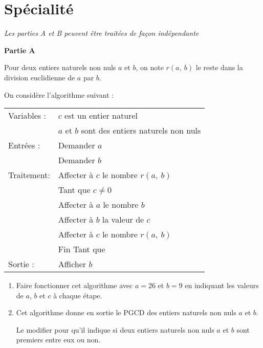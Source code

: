 \documentclass{cornouaille}
\begin{document}
\section{Spécialité}
\begin{exercice}[Spécialité][5]

\emph{Les parties A et B peuvent être traitées de façon indépendante}

\medskip

\textbf{Partie A}

\medskip

Pour deux entiers naturels non nuls $a$ et $b$, on note $r(a,~b)$ le reste dans la division euclidienne de $a$ par $b$.

On considère l'algorithme suivant :

\begin{center}
\begin{tabularx}{0.7\linewidth}{|l|X|}\hline
Variables :	& $c$ est un entier naturel\\
			&$a$ et $b$ sont des entiers naturels non nuls\\
Entrées :	&Demander $a$\\
			&Demander $b$\\
Traitement:	&Affecter à $c$ le nombre $r(a,~b)$\\
			&Tant que $c \ne 0$\\
			&\hspace{0.5cm}Affecter à $a$ le nombre $b$\\
			&\hspace{0.5cm}Affecter à $b$ la valeur de $c$\\
			&\hspace{0.5cm}Affecter à $c$ le nombre $r(a,~b)$\\
			&Fin Tant que\\
Sortie :	&Afficher $b$\\ \hline
			\end{tabularx}
			\end{center}

\begin{enumerate}
\item Faire fonctionner cet algorithme avec $a = 26$ et $b = 9$ en indiquant les valeurs de $a$, $b$ et $c$ à chaque étape.
\item Cet algorithme donne en sortie le PGCD des entiers naturels non nuls $a$ et $b$.

Le modifier pour qu'il indique si deux entiers naturels non nuls $a$ et $b$ sont premiers entre
eux ou non.
\end{enumerate}


\end{exercice}
\end{document}
